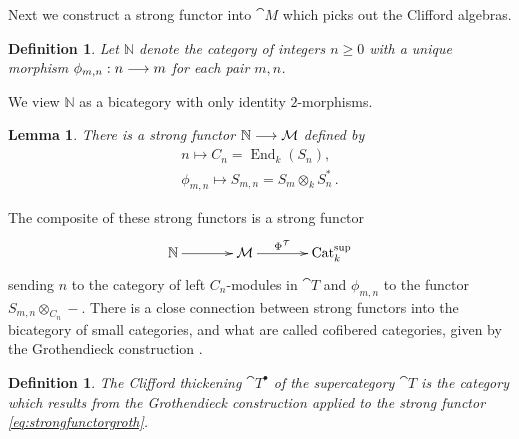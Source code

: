 \documentclass[english,letter paper,12pt,leqno]{article}
\newtheorem{lemma}[theorem]{Lemma}
\theoremstyle{example}
\newtheorem{definition}[theorem]{Definition}
\numberwithin{equation}{section}
\DeclareMathOperator{\End}{End}
\DeclareMathOperator{\Cat}{Cat}
\begin{document}
Next we construct a strong functor into $\cat{M}$ which picks out the Clifford algebras.

\begin{definition}
Let $\mathbb{N}$ denote the category of integers $n \ge 0$ with a unique morphism $\phi_{m,n}: n \longrightarrow m$ for each pair $m,n$. %
\end{definition}

We view $\mathbb{N}$ as a bicategory with only identity $2$-morphisms.

\begin{lemma} There is a strong functor $\mathbb{N} \longrightarrow \mathcal{M}$ defined by
\begin{gather*}
n \mapsto C_n = \End_k( S_n ),\\
\phi_{m,n} \mapsto S_{m,n} = S_m \otimes_k S_n^*\,.
\end{gather*}
\end{lemma}

The composite of these strong functors is a strong functor
\begin{equation}\label{eq:strongfunctorgroth}
\xymatrix@C+1pc{
\mathbb{N} \ar[r] & \cat{M} \ar[r]^-{\Phi^{\cat{T}}} & \Cat^{\operatorname{sup}}_k
}
\end{equation}
sending $n$ to the category of left $C_n$-modules in $\cat{T}$ and $\phi_{m,n}$ to the functor $S_{m,n} \otimes_{C_n} -$. There is a close connection between strong functors into the bicategory of small categories, and what are called cofibered categories, given by the Grothendieck construction \cite{vistoli}.

\begin{definition} The \emph{Clifford thickening} $\cat{T}^\bullet$ of the supercategory $\cat{T}$ is the category which results from the Grothendieck construction applied to the strong functor \eqref{eq:strongfunctorgroth}.
\end{definition}
\end{document}
